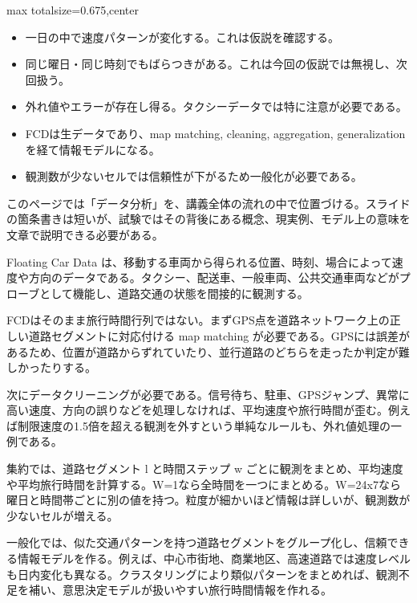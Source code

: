 \begin{adjustbox}{max totalsize={\textwidth}{0.675\textheight},center}
\begin{minipage}{\textwidth}\scriptsize
\begin{minipage}[t]{0.485\textwidth}
\begin{itemize}
\item 一日の中で速度パターンが変化する。これは仮説を確認する。
\item 同じ曜日・同じ時刻でもばらつきがある。これは今回の仮説では無視し、次回扱う。
\item 外れ値やエラーが存在し得る。タクシーデータでは特に注意が必要である。
\end{itemize}
\begin{itemize}
\item FCDは生データであり、map matching, cleaning, aggregation, generalization を経て情報モデルになる。
\item 観測数が少ないセルでは信頼性が下がるため一般化が必要である。
\end{itemize}
\end{minipage}\hfill
\begin{minipage}[t]{0.485\textwidth}
このページでは「データ分析」を、講義全体の流れの中で位置づける。スライドの箇条書きは短いが、試験ではその背後にある概念、現実例、モデル上の意味を文章で説明できる必要がある。\par
Floating Car Data は、移動する車両から得られる位置、時刻、場合によって速度や方向のデータである。タクシー、配送車、一般車両、公共交通車両などがプローブとして機能し、道路交通の状態を間接的に観測する。\par
FCDはそのまま旅行時間行列ではない。まずGPS点を道路ネットワーク上の正しい道路セグメントに対応付ける map matching が必要である。GPSには誤差があるため、位置が道路からずれていたり、並行道路のどちらを走ったか判定が難しかったりする。\par
次にデータクリーニングが必要である。信号待ち、駐車、GPSジャンプ、異常に高い速度、方向の誤りなどを処理しなければ、平均速度や旅行時間が歪む。例えば制限速度の1.5倍を超える観測を外すという単純なルールも、外れ値処理の一例である。\par
集約では、道路セグメント l と時間ステップ w ごとに観測をまとめ、平均速度や平均旅行時間を計算する。W=1なら全時間を一つにまとめる。W=24x7なら曜日と時間帯ごとに別の値を持つ。粒度が細かいほど情報は詳しいが、観測数が少ないセルが増える。\par
一般化では、似た交通パターンを持つ道路セグメントをグループ化し、信頼できる情報モデルを作る。例えば、中心市街地、商業地区、高速道路では速度レベルも日内変化も異なる。クラスタリングにより類似パターンをまとめれば、観測不足を補い、意思決定モデルが扱いやすい旅行時間情報を作れる。\par

\end{minipage}
\end{minipage}
\end{adjustbox}
